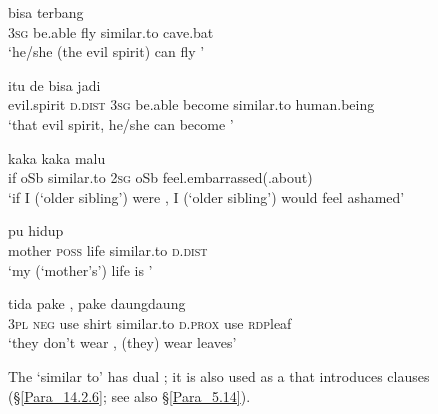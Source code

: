\ea
\label{Example_10.68}
 {bisa} {terbang} {} {}\\ %
 \textsc{3sg}  be.able  fly  similar.to  cave.bat\\
\glt 
‘he/she (the evil spirit) can fly ’ \textstyleExampleSource{[081006-022-CvEx.0137]}
\z

\ea
\label{Example_10.69}
 {itu} {de} {bisa} {jadi} {} {}\\ %
 evil.spirit  \textsc{d.dist}  \textsc{3sg}  be.able  become  similar.to  human.being\\
\glt 
‘that evil spirit, he/she can become ’ \textstyleExampleSource{[081006-022-CvEx.0010]}
\z

\ea
\label{Example_10.70}
 {kaka} {} {} {kaka} {malu}\\ %
 if  oSb  similar.to  \textsc{2sg}  oSb  feel.embarrassed(.about)\\
\glt 
‘if I (‘older sibling’) were , I (‘older sibling’) would feel ashamed’ \textstyleExampleSource{[081115-001a-Cv.0040]}
\z

\ea
\label{Example_10.71}
 {pu} {hidup} {} {}\\ %
 mother  \textsc{poss}  life  similar.to  \textsc{d.dist}\\
\glt 
‘my (‘mother’s’) life is ’ \textstyleExampleSource{[080922-001a-CvPh.0932/0938]}
\z

\ea
\label{Example_10.72}
 {tida} {pake} {} {} {,} {pake} {daung{\Tilde}daung}\\ %
 \textsc{3pl}  \textsc{neg}  use  shirt  similar.to  \textsc{d.prox}  use  \textsc{rdp}{\Tilde}leaf\\
\glt 
‘they don’t wear , (they) wear leaves’ \textstyleExampleSource{[081006-023-CvEx.0007]}
\z


The   ‘similar to’ has dual ; it is also used as a  that introduces  clauses (§\ref{Para_14.2.6}; see also §\ref{Para_5.14}).



